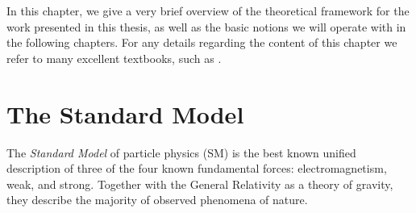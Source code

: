 \renewcommand{\L}{{\mathscr{L}}}
\newcommand{\MSbar}{$\overline{\mathrm{MS}}$}
\newcommand{\BR}{{\text{BR}}}
\newcommand{\LO}{{\text{LO}}}
\newcommand{\NLO}{{\text{NLO}}}
\newcommand{\EW}{{\text{EW}}}
\newcommand{\QCD}{{\text{QCD}}}
\newcommand{\QED}{{\text{QED}}}
\newcommand{\LEP}{{\text{LEP}}}
\newcommand{\SLD}{{\text{SLD}}}

\newcommand{\SM}{{\text{SM}}}
\newcommand{\PH}{\text{Higgs}}
\newcommand{\YM}{{\text{YM}}}
\newcommand{\Yuk}{{\text{Yukawa}}}
\newcommand{\ferm}{{\text{Matter}}}
\newcommand{\Born}{{\text{Born}}}
\newcommand{\born}{{\text{Born}}}
\newcommand{\corr}{{\text{corr}}}
\newcommand{\onel}{{\mbox{\scriptsize 1-loop}}}
\newcommand{\weak}{{\text{weak}}}
\newcommand{\gs}{g_{s}}
\newcommand{\alphas}{\alpha_{s}}
\newcommand{\muF}{\mu_{F}}
\newcommand{\muR}{\mu_{R}}
\newcommand{\sw}{\sin \theta_W}
\newcommand{\cw}{\cos \theta_W}
\newcommand{\GF}{G_\mu}

\newcommand{\Pl}{\ell}
\newcommand{\rc}{{\mathrm{c}}}
\newcommand{\rI}{{\mathrm{I}}}
\newcommand{\ri}{{\mathrm{i}}}
\newcommand{\rd}{{\mathrm{d}}}
\newcommand{\rU}{{\mathrm{U}}}
\newcommand{\rL}{{\mathrm{L}}}
\newcommand{\rR}{{\mathrm{R}}}
\newcommand{\rT}{{\mathrm{T}}}
\newcommand{\rY}{{\mathrm{Y}}}



In this chapter, we give a very brief overview of the theoretical framework
for the work presented in this thesis, as well as the basic notions we
will operate with in the following chapters.
For any details regarding the content of this chapter we refer to many excellent textbooks, such as \cite{PeskinS,Schwartz:2013pla}.


\section{The Standard Model}

The \emph{Standard Model} of particle physics (SM) is the best known unified description of three of the
four known fundamental forces: electromagnetism, weak, and strong.
Together with the General Relativity as a theory of gravity,
they describe the majority of observed phenomena of nature.


